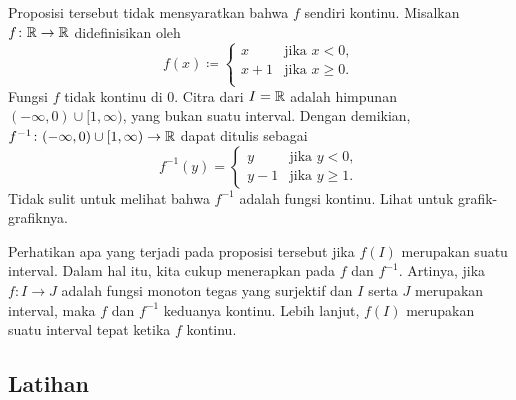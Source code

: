 \begin{example}
Proposisi tersebut tidak mensyaratkan bahwa $f$ sendiri kontinu.  Misalkan
$f \colon {\mathbb{R}} \to {\mathbb{R}}$ didefinisikan oleh
\begin{equation*}
f(x) \coloneqq
\begin{cases}
x & \text{jika } x < 0, \\
x+1 & \text{jika } x \geq 0. \\
\end{cases}
\end{equation*}
Fungsi $f$ tidak kontinu di $0$.
Citra dari $I = {\mathbb{R}}$ adalah himpunan 
$(-\infty,0)\cup [1,\infty)$, yang bukan suatu interval.
Dengan demikian, $f^{-1} \colon (-\infty,0)\cup [1,\infty)
\to {\mathbb{R}}$ dapat ditulis sebagai
\begin{equation*}
f^{-1}(y) =
\begin{cases}
y & \text{jika } y < 0, \\
y-1 & \text{jika } y \geq 1. 
\end{cases}
\end{equation*}
Tidak sulit untuk melihat bahwa $f^{-1}$ adalah fungsi kontinu.  Lihat
 untuk grafik-grafiknya.
\begin{myfigureht}
\caption{Grafik $f$ di sebelah kiri dan $f^{-1}$ di sebelah kanan.\label{invcontfig}}
\end{myfigureht}
\end{example}

Perhatikan apa yang terjadi pada proposisi tersebut jika $f(I)$ merupakan suatu interval.
Dalam hal itu, kita cukup
menerapkan  pada $f$ dan $f^{-1}$.  Artinya, jika
$f \colon I \to J$ adalah fungsi monoton tegas yang surjektif dan $I$ serta $J$ merupakan interval,
maka $f$ dan $f^{-1}$ keduanya kontinu.  Lebih lanjut, $f(I)$ merupakan suatu
interval tepat ketika $f$ kontinu.

\subsection{Latihan}

